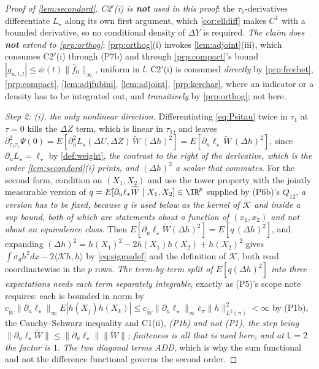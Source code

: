 \begin{proof}[Proof of \cref{lem:secondord}]
\emph{C2$'$(i) is \textbf{not} used in this proof}: the $\tau_1$-derivatives differentiate $L_\star$
along its own first argument, which
\cref{cor:elldiff} makes $C^{1}$ with a bounded derivative, so no conditional density of $\Delta Y$ is
required. \emph{The claim does \textbf{not} extend to \cref{prp:orthog}}:
\cref{prp:orthog}(i) invokes \cref{lem:adjoint}(iii), which consumes C2$'$(i) through (P7b) and
through \cref{prp:compact}'s bound $|g_{u,t,l}|\le\bar w(t)\|\bar f_0\|_\infty$, uniform in $l$. C2$'$(i) is consumed
\emph{directly} by \cref{prp:frechet}, \cref{prp:compact}, \cref{lem:adjfubini}, \cref{lem:adjoint},
\cref{prp:kerchar}, where an indicator or a density has to be integrated out, and
\emph{transitively} by \cref{prp:orthog}; not here.

\emph{Step 2: (i), the only nonlinear direction.}
Differentiating \eqref{eq:Psitau} twice in $\tau_1$ at $\tau=0$ kills the $\Delta Z$ term, which is linear
in $\tau_1$, and leaves
$\partial^{2}_{\tau_1\tau_1}\Psi(0)=E[\partial_u^{2}L_\star(\Delta U,\Delta Z)\,\widetilde W\,(\Delta h)^{2}]
=E[\partial_u\ell_\star\,\widetilde W\,(\Delta h)^{2}]$, since $\partial_uL_\star=\ell_\star$ by
\cref{def:weight}, \emph{the contrast to the right of the derivative, which is the order
\cref{lem:secondord}\textup{(i)} prints, and $(\Delta h)^{2}$ a scalar that commutes}. For the second
form, condition on $(X_1,X_2)$ and use the tower property with the
jointly measurable version of
$q=E[\partial_u\ell_\star\widetilde W\mid X_1,X_2]\in\IR^{p}$ supplied by (P6b)'s $Q_{12}$, \emph{a
version has
to be fixed, because $q$ is used below as the kernel of $\mathcal K$ and inside a sup bound, both of
which are statements about a function of $(x_1,x_2)$ and not about an equivalence class}. Then
$E[\partial_u\ell_\star\widetilde W(\Delta h)^{2}]=E[q\,(\Delta h)^{2}]$, and expanding
$(\Delta h)^{2}=h(X_1)^{2}-2h(X_1)h(X_2)+h(X_2)^{2}$ gives
$\int\sigma_q h^{2}dx-2\langle\mathcal Kh,h\rangle$ by \eqref{eq:sigmadef} and the definition of
$\mathcal K$, both read coordinatewise in the $p$ rows. \emph{The term-by-term split of
$E[q(\Delta h)^{2}]$ into three expectations needs each
term separately integrable}, exactly as (P5)'s scope note requires: each is bounded in norm by
$c_{\widetilde W}\|\partial_u\ell_\star\|_\infty E|h(X_j)h(X_k)|
\le c_{\widetilde W}\|\partial_u\ell_\star\|_\infty\bar c_\pi\|h\|^{2}_{L^{2}(\pi)}<\infty$
by \textup{(P1b)}, the Cauchy--Schwarz inequality and C1(ii), \emph{\textup{(P1b)} and not
\textup{(P1)}, the step being $\|\partial_u\ell_\star\widetilde W\|\le\|\partial_u\ell_\star\|\|\widetilde W\|$;
finiteness is all that is used here, and at $\mathsf L=2$ the factor is $1$}. \emph{The two diagonal terms
ADD}, which is why the
sum functional and not the difference functional governs the second order.


\end{proof}
